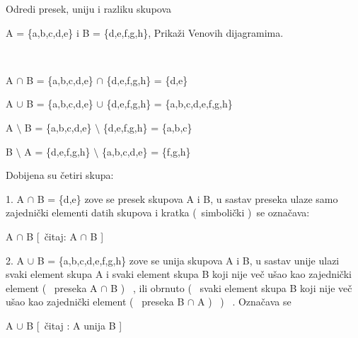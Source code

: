 \begin{zad}

    Odredi presek, uniju i razliku skupova\

    

    A = \{a,b,c,d,e\} i B = \{d,e,f,g,h\}, Prika\v zi Venovih dijagramima. 

    \ 

    

    A $\cap$ B = \{a,b,c,d,e\} $\cap$ \{d,e,f,g,h\} = \{d,e\}



    A $\cup$ B = \{a,b,c,d,e\} $\cup$ \{d,e,f,g,h\} = \{a,b,c,d,e,f,g,h\}



    A $\setminus$ B = \{a,b,c,d,e\} $\setminus$ \{d,e,f,g,h\} = \{a,b,c\}



    B $\setminus$ A = \{d,e,f,g,h\} $\setminus$ \{a,b,c,d,e\} = \{f,g,h\} \

    

    Dobijena su \v cetiri skupa:\



    1. A $\cap$ B = \{d,e\} zove se presek skupova A i B, u sastav preseka ulaze samo zajedni\v cki elementi datih skupova i kratka (\ simboli\v cki )\ se ozna\v cava: \ 



    A $\cap$ B [\ \v citaj: A $\cap$ B ]\



    2. A $\cup$ B = \{a,b,c,d,e,f,g,h\} zove se unija skupova A i B, u sastav unije ulazi svaki element skupa A i svaki element skupa B koji nije ve\v c u\v sao kao zajedni\v cki element ( \ preseka A $\cap$ B ) \ , ili obrnuto ( \ svaki element skupa B koji nije ve\v c u\v sao kao zajedni\v cki element ( \ preseka B $\cap$ A ) \ ) \ . Ozna\v cava se \ 



    A $\cup$ B [\ \v citaj : A unija B ]\

\end{zad}

